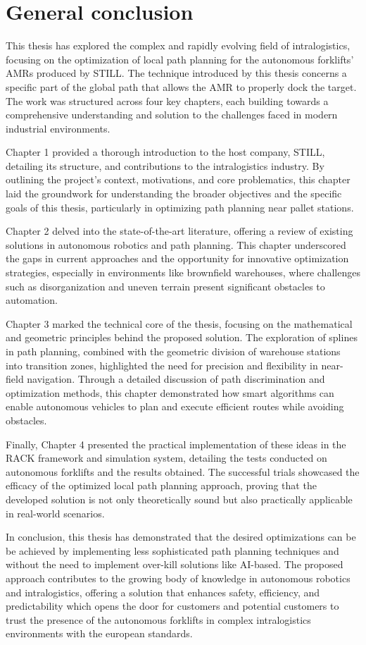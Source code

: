 \chapter*{General conclusion}

This thesis has explored the complex and rapidly evolving field of intralogistics, focusing on the optimization of 
local path planning for the autonomous forklifts' AMRs produced by STILL. The technique introduced by this thesis 
concerns a specific part of the global path that allows the AMR to properly dock the target. The work was structured 
across four key chapters, each building towards a comprehensive understanding and solution to the challenges faced 
in modern industrial environments.

Chapter 1 provided a thorough introduction to the host company, STILL, detailing its structure, and contributions 
to the intralogistics industry. By outlining the project’s context, motivations, and core problematics, this chapter 
laid the groundwork for understanding the broader objectives and the specific goals of this thesis, particularly 
in optimizing path planning near pallet stations.

\noindent Chapter 2 delved into the state-of-the-art literature, offering a review of existing solutions in autonomous 
robotics and path planning. This chapter underscored the gaps in current approaches and the opportunity for 
innovative optimization strategies, especially in environments like brownfield warehouses, where challenges such 
as disorganization and uneven terrain present significant obstacles to automation.

\noindent Chapter 3 marked the technical core of the thesis, focusing on the mathematical and geometric principles behind 
the proposed solution. The exploration of splines in path planning, combined with the geometric division of 
warehouse stations into transition zones, highlighted the need for precision and flexibility in near-field 
navigation. Through a detailed discussion of path discrimination and optimization methods, this chapter 
demonstrated how smart algorithms can enable autonomous vehicles to plan and execute efficient routes 
while avoiding obstacles.

\noindent Finally, Chapter 4 presented the practical implementation of these ideas in the RACK framework and simulation 
system, detailing the tests conducted on autonomous forklifts and the results obtained. The successful trials 
showcased the efficacy of the optimized local path planning approach, proving that the developed solution is 
not only theoretically sound but also practically applicable in real-world scenarios.

In conclusion, this thesis has demonstrated that the desired optimizations can be be achieved by implementing less sophisticated path planning techniques and without the need to implement over-kill solutions like AI-based. The proposed approach contributes to the growing body of knowledge in autonomous robotics and intralogistics, offering a solution that enhances safety, efficiency, and predictability which opens the door for customers and potential customers to trust the presence of the autonomous forklifts in complex intralogistics environments with the european standards.